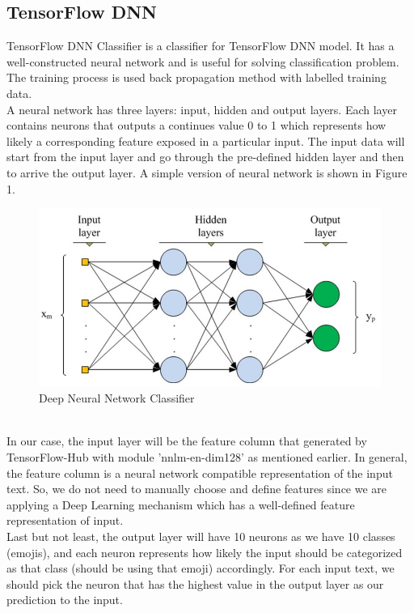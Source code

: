 \documentclass[12pt]{article}
\begin{document}
\subsection{TensorFlow DNN}

TensorFlow DNN Classifier is a classifier for TensorFlow DNN model. It has a well-constructed neural network and is useful for solving classification problem. The training process is used back propagation method with labelled training data.
\medskip \\
A neural network has three layers: input, hidden and output layers. Each layer contains neurons that outputs a continues value 0 to 1 which represents how likely a corresponding feature exposed in a particular input. The input data will start from the input layer and go through the pre-defined hidden layer and then to arrive the output layer. A simple version of neural network is shown in Figure 1.
\begin{figure}
  \includegraphics[width=\linewidth]{nn.jpeg}
  \caption{Deep Neural Network Classifier \cite{dnnc}}
  \label{fig:dnnc}
\end{figure}
\medskip \\
In our case, the input layer will be the feature column that generated by TensorFlow-Hub with module 'nnlm-en-dim128' as mentioned earlier. In general, the feature column is a neural network compatible representation of the input text. So, we do not need to manually choose and define features since we are applying a Deep Learning mechanism which has a well-defined feature representation of input. 
\medskip \\
Last but not least, the output layer will have 10 neurons as we have 10 classes (emojis), and each neuron represents how likely the input should be categorized as that class (should be using that emoji) accordingly. For each input text, we should pick the neuron that has the highest value in the output layer as our prediction to the input.
\end{document}
